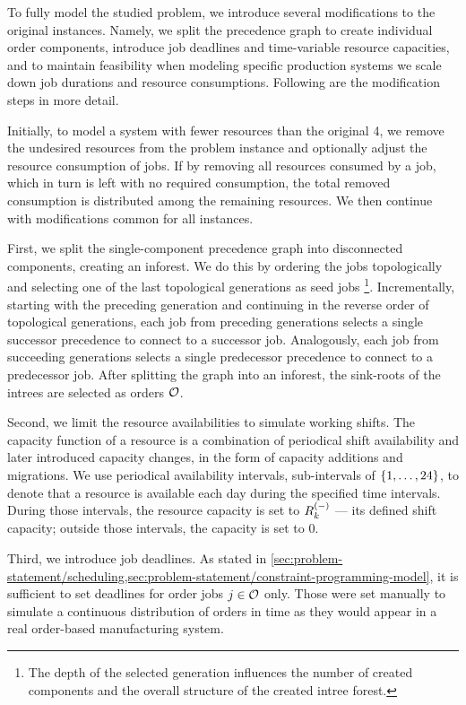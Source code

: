 To fully model the studied problem, we introduce several modifications to the original instances.
Namely, we split the precedence graph to create individual order components,
introduce job deadlines and time-variable resource capacities,
and to maintain feasibility when modeling specific production systems
we scale down job durations and resource consumptions.
Following are the modification steps in more detail.

Initially, to model a system with fewer resources than the original 4,
we remove the undesired resources from the problem instance
and optionally adjust the resource consumption of jobs.
If by removing all resources consumed by a job,
which in turn is left with no required consumption,
the total removed consumption is distributed among the remaining resources.
We then continue with modifications common for all instances.

First, we split the single-component precedence graph into disconnected components,
creating an inforest.
We do this by ordering the jobs topologically
and selecting one of the last topological generations as seed jobs%
\footnote{The depth of the selected generation influences the number of created components
and the overall structure of the created intree forest.}.
Incrementally, starting with the preceding generation
and continuing in the reverse order of topological generations,
each job from preceding generations selects a single successor precedence
to connect to a successor job.
Analogously, each job from succeeding generations selects a single predecessor precedence
to connect to a predecessor job.
After splitting the graph into an inforest,
the sink-roots of the intrees are selected as orders $\mathcal{O}$.

Second, we limit the resource availabilities to simulate working shifts.
The capacity function of a resource is a combination of periodical shift availability
and later introduced capacity changes, in the form of capacity additions and migrations.
We use periodical availability intervals, sub-intervals of $\{{1}, \dots, {24}\}$,
to denote that a resource is available each day during the specified time intervals.
During those intervals, the resource capacity is set to $\shiftcapacity{k}$
--- its defined shift capacity; outside those intervals, the capacity is set to $0$.

Third, we introduce job deadlines.
As stated in \cref{sec:problem-statement/scheduling,sec:problem-statement/constraint-programming-model},
it is sufficient to set deadlines for order jobs $j \in \mathcal{O}$ only.
Those were set manually to simulate a continuous distribution of orders in time
as they would appear in a real order-based manufacturing system.

